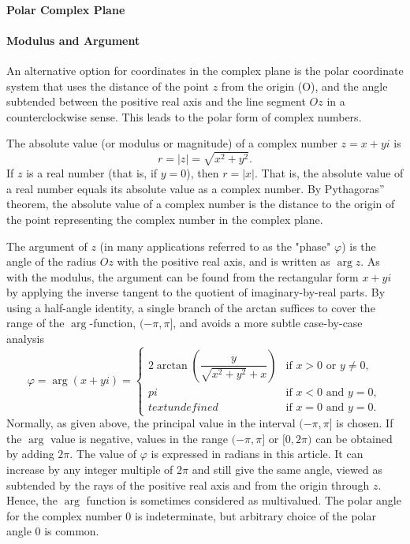 \paragraph{Polar Complex Plane}

\paragraph{Modulus and Argument}

An alternative option for coordinates in the complex plane is the polar coordinate system that uses the distance of the point $z$ from the origin (O), and the angle subtended between the positive real axis and the line segment $Oz$ in a counterclockwise sense. This leads to the polar form of complex numbers.

The absolute value (or modulus or magnitude) of a complex number $z = x + yi$ is
$$
r = |z| = \sqrt{x^2 + y^2}.
$$
If $z$ is a real number (that is, if $y = 0$), then $r = |x|$. That is, the absolute value of a real number equals its absolute value as a complex number. By Pythagoras'' theorem, the absolute value of a complex number is the distance to the origin of the point representing the complex number in the complex plane.

The argument of $z$ (in many applications referred to as the "phase" $\varphi$) is the angle of the radius $Oz$ with the positive real axis, and is written as $\arg z$. As with the modulus, the argument can be found from the rectangular form $x + yi$ by applying the inverse tangent to the quotient of imaginary-by-real parts. By using a half-angle identity, a single branch of the arctan suffices to cover the range of the $\arg$-function, $(-\pi, \pi]$, and avoids a more subtle case-by-case analysis
$$
\varphi = \arg(x + yi) = 
\begin{cases} 
2\arctan\left(\dfrac{y}{\sqrt{x^2 + y^2} + x}\right) & \text{if } x > 0 \text{ or } y \neq 0, \\pi & \text{if } x < 0 \text{ and } y = 0, \\text{undefined} & \text{if } x = 0 \text{ and } y = 0. 
\end{cases}
$$
Normally, as given above, the principal value in the interval $(-\pi, \pi]$ is chosen. If the $\arg$ value is negative, values in the range $(-\pi, \pi]$ or $[0, 2\pi)$ can be obtained by adding $2\pi$. The value of $\varphi$ is expressed in radians in this article. It can increase by any integer multiple of $2\pi$ and still give the same angle, viewed as subtended by the rays of the positive real axis and from the origin through $z$. Hence, the $\arg$ function is sometimes considered as multivalued. The polar angle for the complex number $0$ is indeterminate, but arbitrary choice of the polar angle $0$ is common.

